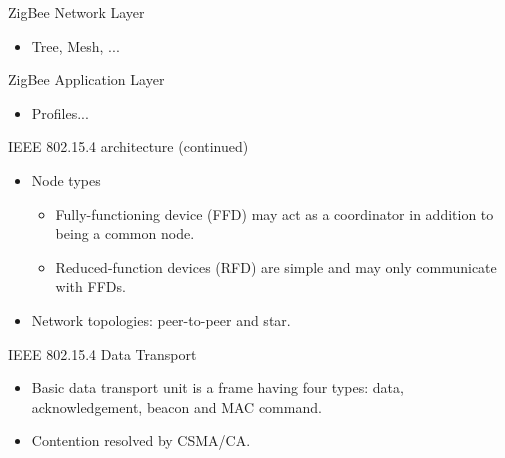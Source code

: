 \documentclass{beamer}
\begin{document}
\begin{frame}{ZigBee Network Layer}
  \begin{itemize}
  	\item Tree, Mesh, ...
  \end{itemize}
\end{frame}

\begin{frame}{ZigBee Application Layer}
  \begin{itemize}
  	\item Profiles...
  \end{itemize}
\end{frame}

\begin{frame}{IEEE 802.15.4 architecture (continued)}
  \begin{itemize}
    \item Node types  
      \begin{itemize}
      \item Fully-functioning device (FFD) may act as a coordinator in addition
      to being a common node. 
      \item Reduced-function devices (RFD) are simple and may only communicate
      with FFDs.
    \end{itemize}
    \item Network topologies: peer-to-peer and star.
  \end{itemize}
\end{frame}

\begin{frame}{IEEE 802.15.4 Data Transport}
  \begin{itemize}
    \item Basic data transport unit is a frame having four types: data, 
    acknowledgement, beacon and MAC command.
    \item Contention resolved by CSMA/CA.
  \end{itemize}
\end{frame}
\end{document}
